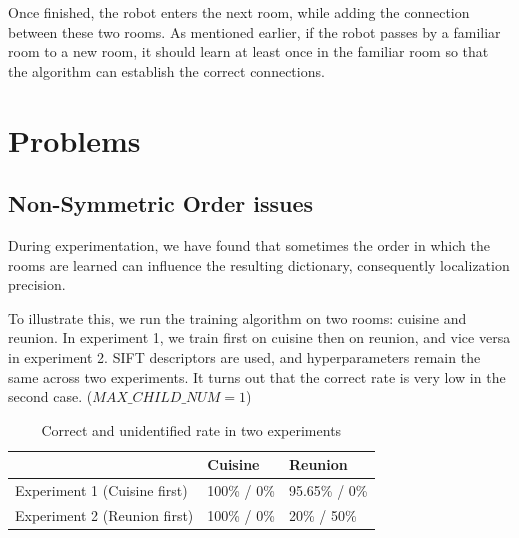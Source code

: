 \documentclass[a4paper]{scrartcl}
\begin{document}
Once finished, the robot enters the next room, while adding the connection between these two rooms. As mentioned earlier, if the robot passes by a familiar room to a new room, it should learn at least once in the familiar room so that the algorithm can establish the correct connections.

\section{Problems}
\subsection{Non-Symmetric Order issues}
During experimentation, we have found that sometimes the order in which the rooms are learned can influence the resulting dictionary, consequently localization precision.

To illustrate this, we run the training algorithm on two rooms: cuisine and reunion. In experiment 1, we train first on cuisine then on reunion, and vice versa in experiment 2. SIFT descriptors are used, and hyperparameters remain the same across two experiments. It turns out that the correct rate is very low in the second case. ($ \textit{MAX\_CHILD\_NUM} = 1$)

\begin{table}[H]
\centering
\caption{Correct and unidentified rate in two experiments}
\label{rates_nonsym}
\begin{tabular}{l l l}
\hline
        & Cuisine        &   Reunion      \\ \hline
Experiment 1 (Cuisine first)   & 100\% / 0\% & 95.65\% / 0\% \\ \hline
Experiment 2 (Reunion first) &  100\% / 0\% & 20\% / 50\% \\ \hline
\end{tabular}
\end{table}

\end{document}
